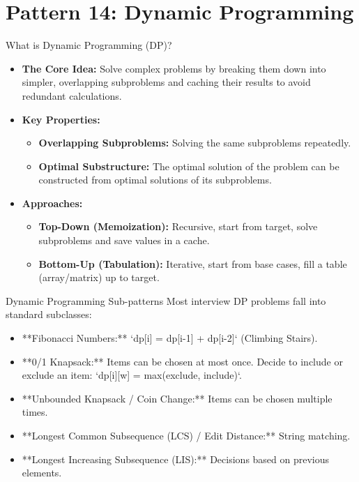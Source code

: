 \section{Pattern 14: Dynamic Programming}

\begin{frame}[c]{\empty}
    \begin{center}
        \Large\textbf{\secname}
    \end{center}
\end{frame}

\begin{frame}{What is Dynamic Programming (DP)?}
  \begin{itemize}
    \item \textbf{The Core Idea:} Solve complex problems by breaking them down into simpler, overlapping subproblems and caching their results to avoid redundant calculations.
    \item \textbf{Key Properties:}
      \begin{itemize}
        \item \textbf{Overlapping Subproblems:} Solving the same subproblems repeatedly.
        \item \textbf{Optimal Substructure:} The optimal solution of the problem can be constructed from optimal solutions of its subproblems.
      \end{itemize}
    \item \textbf{Approaches:}
      \begin{itemize}
        \item \textbf{Top-Down (Memoization):} Recursive, start from target, solve subproblems and save values in a cache.
        \item \textbf{Bottom-Up (Tabulation):} Iterative, start from base cases, fill a table (array/matrix) up to target.
      \end{itemize}
  \end{itemize}
\end{frame}

\begin{frame}{Dynamic Programming Sub-patterns}
  Most interview DP problems fall into standard subclasses:
  \begin{itemize}
    \item **Fibonacci Numbers:** `dp[i] = dp[i-1] + dp[i-2]` (Climbing Stairs).
    \item **0/1 Knapsack:** Items can be chosen at most once. Decide to include or exclude an item: `dp[i][w] = max(exclude, include)`.
    \item **Unbounded Knapsack / Coin Change:** Items can be chosen multiple times.
    \item **Longest Common Subsequence (LCS) / Edit Distance:** String matching.
    \item **Longest Increasing Subsequence (LIS):** Decisions based on previous elements.
  \end{itemize}
\end{frame}


